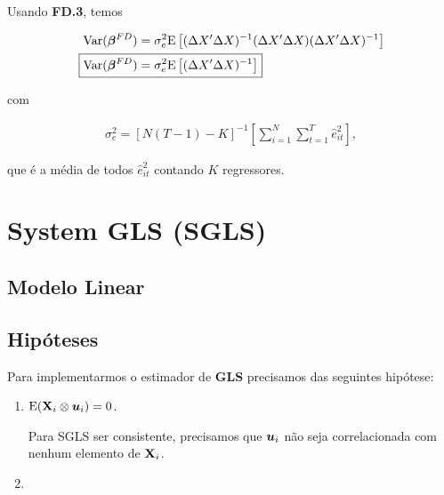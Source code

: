 \documentclass[11pt, oneside, a4paper, article]{article}
\numberwithin{equation}{section}
\begin{document}
\begin{description}
Usando \textbf{FD.3}, temos

\vspace{-1 em}
\begin{align*} 
\Var( \betavec^{FD} ) &= 
\sigma_{e}^{2}
\E \left[
( \Delta X' \Delta X )^{-1}
( \Delta X' \Delta X )
( \Delta X' \Delta X )^{-1} 
\right]
\\
\Aboxed{
\Var( \betavec^{FD} ) &= 
\sigma^2_{e}
\E \left[
( \Delta X' \Delta X )^{-1} 
\right]}
\end{align*}

\noindent 
com

\vspace{-1 em}
\begin{align*} 
\sigma^2_{e} = 
\left[ N ( T - 1 ) - K \right]^{-1}
\left[  
\sum_{i=1}^{N} 
\sum_{t=1}^{T}
\hat{e}_{it}^{2}
\right],
\end{align*}

\noindent
que é a média de todos $\hat{e}^{2}_{it}$ contando $K$ regressores.

\clearpage
\section{System GLS (SGLS)}

\noindent
\citet[Sec.7.4 -- Consistency and Asymptotic Normality of Generalized Least Squares, p.153]{wool-2010} 

\subsection{Modelo Linear}

\subsection{Hipóteses}

Para implementarmos o estimador de \textbf{GLS} precisamos das seguintes hipótese:

\begin{enumerate}
\item %

$\text{E}(\mathbf{X}_{i} \otimes \boldsymbol{u}_{i}) = 0$.

Para SGLS ser consistente, precisamos que $\boldsymbol{u}_{i}$ não seja correlacionada com nenhum elemento de $\mathbf{X}_{i}$.

\item %


\end{enumerate}
\end{description}
\end{document}
